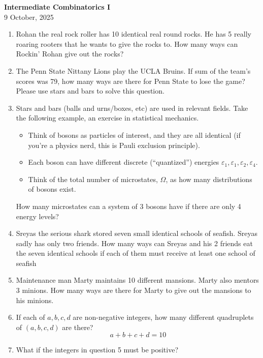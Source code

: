 \documentclass[inline]{article}
\begin{document}
\begin{center}
{\Large\bfseries Intermediate Combinatorics I}\\[0.25cm]
{\large 9 October, 2025}\\[1cm]
\end{center}

\begin{enumerate}[itemsep=2.85cm]
    \item Rohan the real rock roller has 10 identical real round rocks. He has 5 really roaring rooters that he wants to give the rocks to. How many ways can Rockin' Rohan give out the rocks?
    \item The Penn State Nittany Lions play the UCLA Bruins. If sum of the team's scores was 79, how many ways are there for Penn State to lose the game? Please use stars and bars to solve this question.
    \item Stars and bars (balls and urns/boxes, etc) are used in relevant fields. Take the following example, an exercise in statistical mechanics. 
    \begin{itemize}
        \item Think of bosons as particles of interest, and they are all identical (if you're a physics nerd, this is Pauli exclusion principle).
        \item Each boson can have different discrete (``quantized'') energies $\varepsilon_1, \varepsilon_1, \varepsilon_2,\varepsilon_4$.
        \item Think of the total number of microstates, $\Omega$, as how many distributions of bosons exist.
    \end{itemize}
    How many microstates can a system of 3 bosons have if there are only 4 energy levels?
    \item Sreyas the serious shark stored seven small identical schools of seafish. Sreyas sadly has only two friends. How many ways can Sreyas and his 2 friends eat the seven identical schools if each of them must receive at least one school of seafish
    \item Maintenance man Marty maintains 10 different mansions. Marty also mentors 3 minions. How many ways are there for Marty to give out the mansions to his minions.
    \item If each of $a, b, c, d$ are non-negative integers, how many different quadruplets of $(a,b,c,d)$ are there?
    \[
        a+b+c+d=10
    \]
    \item What if the integers in question 5 must be positive?

\end{enumerate}
\end{document}
